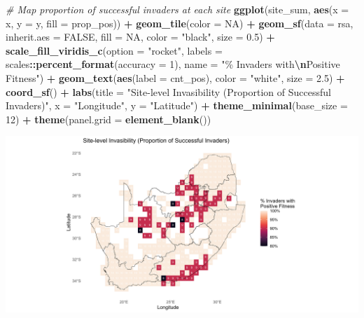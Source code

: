 \documentclass[
]{article}
\newenvironment{Shaded}{\begin{snugshade}}{\end{snugshade}}
\newcommand{\AttributeTok}[1]{\textcolor[rgb]{0.13,0.29,0.53}{#1}}
\newcommand{\CommentTok}[1]{\textcolor[rgb]{0.56,0.35,0.01}{\textit{#1}}}
\newcommand{\ConstantTok}[1]{\textcolor[rgb]{0.56,0.35,0.01}{#1}}
\newcommand{\DecValTok}[1]{\textcolor[rgb]{0.00,0.00,0.81}{#1}}
\newcommand{\FloatTok}[1]{\textcolor[rgb]{0.00,0.00,0.81}{#1}}
\newcommand{\FunctionTok}[1]{\textcolor[rgb]{0.13,0.29,0.53}{\textbf{#1}}}
\newcommand{\NormalTok}[1]{#1}
\newcommand{\SpecialCharTok}[1]{\textcolor[rgb]{0.81,0.36,0.00}{\textbf{#1}}}
\newcommand{\StringTok}[1]{\textcolor[rgb]{0.31,0.60,0.02}{#1}}
\begin{document}
\begin{Shaded}
\begin{Highlighting}[]
\CommentTok{\# Map proportion of successful invaders at each site}
\FunctionTok{ggplot}\NormalTok{(site\_sum, }\FunctionTok{aes}\NormalTok{(}\AttributeTok{x =}\NormalTok{ x, }\AttributeTok{y =}\NormalTok{ y, }\AttributeTok{fill =}\NormalTok{ prop\_pos)) }\SpecialCharTok{+}
  \FunctionTok{geom\_tile}\NormalTok{(}\AttributeTok{color =} \ConstantTok{NA}\NormalTok{) }\SpecialCharTok{+}
  \FunctionTok{geom\_sf}\NormalTok{(}\AttributeTok{data =}\NormalTok{ rsa, }\AttributeTok{inherit.aes =} \ConstantTok{FALSE}\NormalTok{, }\AttributeTok{fill =} \ConstantTok{NA}\NormalTok{, }\AttributeTok{color =} \StringTok{"black"}\NormalTok{, }\AttributeTok{size =} \FloatTok{0.5}\NormalTok{) }\SpecialCharTok{+}
  \FunctionTok{scale\_fill\_viridis\_c}\NormalTok{(}\AttributeTok{option =} \StringTok{"rocket"}\NormalTok{, }
                       \AttributeTok{labels =}\NormalTok{ scales}\SpecialCharTok{::}\FunctionTok{percent\_format}\NormalTok{(}\AttributeTok{accuracy =} \DecValTok{1}\NormalTok{),}
                       \AttributeTok{name =} \StringTok{"\% Invaders with}\SpecialCharTok{\textbackslash{}n}\StringTok{Positive Fitness"}\NormalTok{) }\SpecialCharTok{+}
  \FunctionTok{geom\_text}\NormalTok{(}\FunctionTok{aes}\NormalTok{(}\AttributeTok{label =}\NormalTok{ cnt\_pos), }\AttributeTok{color =} \StringTok{"white"}\NormalTok{, }\AttributeTok{size =} \FloatTok{2.5}\NormalTok{) }\SpecialCharTok{+} 
  \FunctionTok{coord\_sf}\NormalTok{() }\SpecialCharTok{+}
  \FunctionTok{labs}\NormalTok{(}\AttributeTok{title =} \StringTok{"Site{-}level Invasibility (Proportion of Successful Invaders)"}\NormalTok{, }
       \AttributeTok{x =} \StringTok{"Longitude"}\NormalTok{, }\AttributeTok{y =} \StringTok{"Latitude"}\NormalTok{) }\SpecialCharTok{+}
  \FunctionTok{theme\_minimal}\NormalTok{(}\AttributeTok{base\_size =} \DecValTok{12}\NormalTok{) }\SpecialCharTok{+}
  \FunctionTok{theme}\NormalTok{(}\AttributeTok{panel.grid =} \FunctionTok{element\_blank}\NormalTok{())}
\end{Highlighting}
\end{Shaded}

\includegraphics[width=1\linewidth]{man/figures/README-site-invasibility-1}
\end{document}
